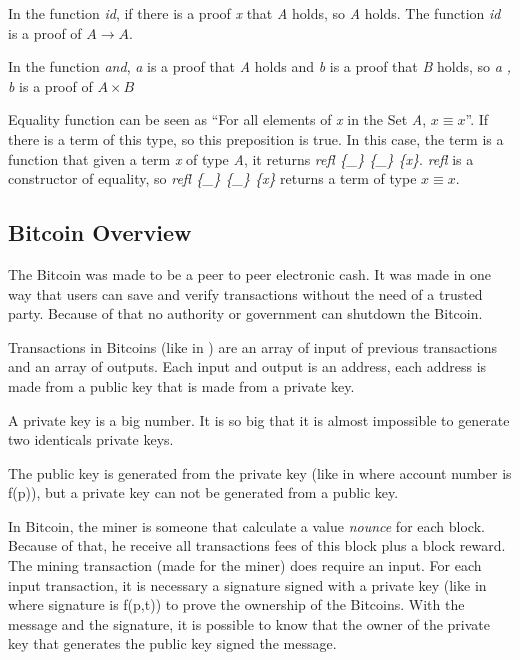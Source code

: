 
In the function \emph{id},
if there is a proof \emph{x} that \emph{A} holds,
so \emph{A} holds.
The function \emph{id} is a proof of $A \rightarrow A$.


In the function \emph{and}, \emph{a} is a proof that \emph{A} holds and
\emph{b} is a proof that \emph{B} holds,
so \emph{a , b} is a proof of $A \times B$


Equality function can be seen as
``For all elements of \emph{x} in the Set \emph{A}, $x \equiv x$''.
If there is a term of this type, so this preposition is true.
In this case, the term is a function that given a term \emph{x} of type \emph{A},
it returns \emph{refl \{\_\} \{\_\} \{x\}}.
\emph{refl} is a constructor of equality, so \emph{refl \{\_\} \{\_\} \{x\}}
returns a term of type $x \equiv x$.

\subsection{Bitcoin Overview}

The Bitcoin was made to be a peer to peer electronic cash.
It was made in one way that users can save and verify transactions without the need of a trusted party.
Because of that no authority or government can shutdown the Bitcoin.


Transactions in Bitcoins (like in ) are an array of input of
previous transactions and an array of outputs.
Each input and output is an address, each address is made from a public key
that is made from a private key.


A private key is a big number.
It is so big that it is almost impossible to generate two identicals private keys.

The public key is generated from the private key
(like in  where account number is f(p)),
but a private key can not be generated from a public key.

In Bitcoin, the miner is someone that calculate a value \emph{nounce} for each block.
Because of that, he receive all transactions fees of this block plus a block reward.
The mining transaction (made for the miner) does require an input.
For each input transaction, it is necessary a signature signed with a private key
(like in  where signature is f(p,t))
to prove the ownership of the Bitcoins.
With the message and the signature, it is possible to know that the owner of the private key
that generates the public key signed the message.


